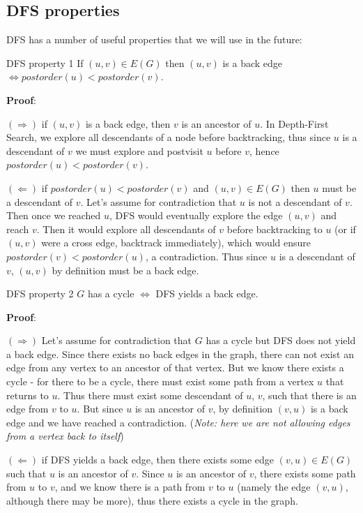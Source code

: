 \documentclass{article}
\begin{document}
\newpage

\subsection{DFS properties}
DFS has a number of useful properties that we will use in the future:

\begin{theorem}{DFS property 1}
    If $(u, v) \in E(G)$ then $(u, v)$ is a back edge $\iff postorder(u) < postorder(v)$.
\end{theorem}

\textbf{Proof}:

$(\Rightarrow)$ if $(u, v)$ is a back edge, then $v$ is an ancestor of $u$. In Depth-First Search, we explore all descendants of a node before backtracking, thus since $u$ is a descendant of $v$ we must explore and postvisit $u$ before $v$, hence $postorder(u) < postorder(v)$.

$(\Leftarrow)$ if $postorder(u) < postorder(v)$ and $(u, v) \in E(G)$ then $u$ must be a descendant of $v$. Let's assume for contradiction that $u$ is not a descendant of $v$. Then once we reached $u$, DFS would eventually explore the edge $(u, v)$ and reach $v$. Then it would explore all descendants of $v$ before backtracking to $u$ (or if $(u, v)$ were a cross edge, backtrack immediately), which would ensure $postorder(v) < postorder(u)$, a contradiction. Thus since $u$ is a descendant of $v$, $(u, v)$ by definition must be a back edge.

\begin{theorem}{DFS property 2}
    $G$ has a cycle $\iff$ DFS yields a back edge.    
\end{theorem}

\textbf{Proof}:

$(\Rightarrow)$ Let's assume for contradiction that $G$ has a cycle but DFS does not yield a back edge. Since there exists no back edges in the graph, there can not exist an edge from any vertex to an ancestor of that vertex. But we know there exists a cycle - for there to be a cycle, there must exist some path from a vertex $u$ that returns to $u$. Thus there must exist some descendant of $u$, $v$, such that there is an edge from $v$ to $u$. But since $u$ is an ancestor of $v$, by definition $(v, u)$ is a back edge and we have reached a contradiction. (\textit{Note: here we are not allowing edges from a vertex back to itself})

$(\Leftarrow)$ if DFS yields a back edge, then there exists some edge $(v, u) \in E(G)$ such that $u$ is an ancestor of $v$. Since $u$ is an ancestor of $v$, there exists some path from $u$ to $v$, and we know there is a path from $v$ to $u$ (namely the edge $(v, u)$, although there may be more), thus there exists a cycle in the graph.
\end{document}
